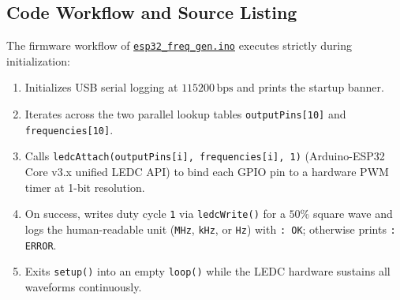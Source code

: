 \documentclass[11pt,a4paper]{article}
\newcommand{\githubrepo}{https://github.com/m7mdelsayegh/frequency_meter}
\newcommand{\ghblob}[2]{\href{\githubrepo/blob/main/#1}{\texttt{#2}}}
\begin{document}
\subsection{Code Workflow and Source Listing}
The firmware workflow of \ghblob{5_ESP32_Signal_Generator/esp32_freq_gen.ino}{esp32\_freq\_gen.ino} executes strictly during initialization:
\begin{enumerate}[leftmargin=1.5em]
    \item Initializes USB serial logging at $115200\,\text{bps}$ and prints the startup banner.
    \item Iterates across the two parallel lookup tables \texttt{outputPins[10]} and \texttt{frequencies[10]}.
    \item Calls \texttt{ledcAttach(outputPins[i], frequencies[i], 1)} (Arduino-ESP32 Core v3.x unified LEDC API) to bind each GPIO pin to a hardware PWM timer at 1-bit resolution.
    \item On success, writes duty cycle \texttt{1} via \texttt{ledcWrite()} for a $50\%$ square wave and logs the human-readable unit (\texttt{MHz}, \texttt{kHz}, or \texttt{Hz}) with \texttt{: OK}; otherwise prints \texttt{: ERROR}.
    \item Exits \texttt{setup()} into an empty \texttt{loop()} while the LEDC hardware sustains all waveforms continuously.
\end{enumerate}
\end{document}

